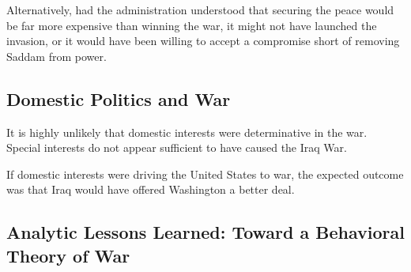 Alternatively, had the administration understood that securing the peace would be far more expensive than winning the war, it might not have launched the invasion, or it would have been willing to accept a compromise short of removing Saddam from power.

\subsection{Domestic Politics and War}

It is highly unlikely that domestic interests were determinative in the war. Special interests do not appear sufficient to have caused the Iraq War.

If domestic interests were driving the United States to war, the expected outcome was that Iraq would have offered Washington a better deal.

\subsection{Analytic Lessons Learned: Toward a Behavioral Theory of War}

